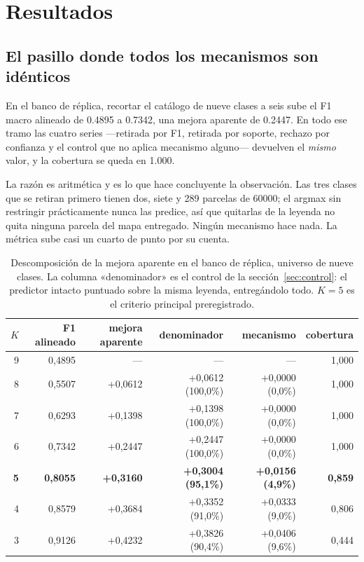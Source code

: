 \section{Resultados}
\label{sec:resultados}

\subsection{El pasillo donde todos los mecanismos son idénticos}
\label{sec:pasillo}

En el banco de réplica, recortar el catálogo de nueve clases a seis sube el F1 macro alineado de
\num{0.4895} a \num{0.7342}, una mejora aparente de \num{0.2447}. En todo ese tramo las cuatro
series —retirada por F1, retirada por soporte, rechazo por confianza y el control que no aplica
mecanismo alguno— devuelven el \emph{mismo} valor, y la cobertura se queda en \num{1.000}.

La razón es aritmética y es lo que hace concluyente la observación. Las tres clases que se retiran
primero tienen dos, siete y \num{289} parcelas de \num{60000}; el argmax sin restringir
prácticamente nunca las predice, así que quitarlas de la leyenda no quita ninguna parcela del mapa
entregado. Ningún mecanismo hace nada. La métrica sube casi un cuarto de punto por su cuenta.

\begin{table}[tbp]
\caption{Descomposición de la mejora aparente en el banco de réplica, universo de nueve clases. La
columna «denominador» es el control de la sección~\ref{sec:control}: el predictor intacto puntuado
sobre la misma leyenda, entregándolo todo. $K = 5$ es el criterio principal preregistrado.}
\label{tab:descomposicion}
\centering
\begin{tabular}{rrrrrr}
\toprule
$K$ & F1 alineado & mejora aparente & denominador & mecanismo & cobertura \\
\midrule
9 & 0,4895 & ---     & ---              & ---            & 1,000 \\
8 & 0,5507 & +0,0612 & +0,0612 (100,0\%) & +0,0000 (0,0\%) & 1,000 \\
7 & 0,6293 & +0,1398 & +0,1398 (100,0\%) & +0,0000 (0,0\%) & 1,000 \\
6 & 0,7342 & +0,2447 & +0,2447 (100,0\%) & +0,0000 (0,0\%) & 1,000 \\
\textbf{5} & \textbf{0,8055} & \textbf{+0,3160} & \textbf{+0,3004 (95,1\%)} & \textbf{+0,0156 (4,9\%)} & \textbf{0,859} \\
4 & 0,8579 & +0,3684 & +0,3352 (91,0\%) & +0,0333 (9,0\%) & 0,806 \\
3 & 0,9126 & +0,4232 & +0,3826 (90,4\%) & +0,0406 (9,6\%) & 0,444 \\
\bottomrule
\end{tabular}
\end{table}

